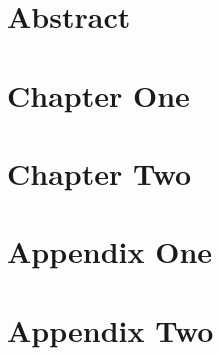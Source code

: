 \documentclass[a4paper,10pt,twoside]{report}
\author{\authorone}
\title{\doctitle}
\begin{document}


\normalsize

\chapter*{Abstract}\label{chapter:Abstract}


\tableofcontents

\chapter{Chapter One}\label{chapter:Chapter One}
\chapter{Chapter Two}\label{chapter:Chapter Two}

\appendix
\chapter{Appendix One}\label{chapter:Appendix One}
\chapter{Appendix Two}\label{chapter:Appendix Two}

\printbibliography{}
\end{document}
